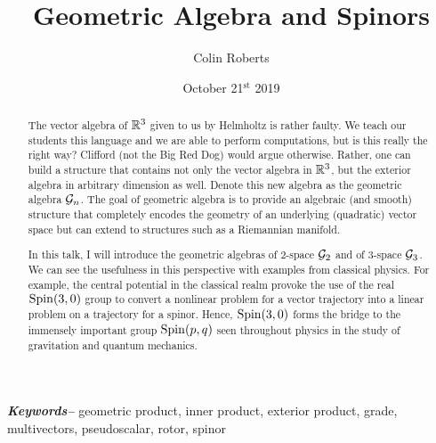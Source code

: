 \documentclass[12pt]{article}
\title{Geometric Algebra and Spinors}
\author{Colin Roberts}
\date{October 21$^\textrm{st}$ 2019}
\providecommand{\keywords}[1]
{
    \hspace*{0pt}\small	
  \textbf{\textit{Keywords--}} #1
}
\begin{document}
\begin{titlingpage}
    \maketitle
    \vfill
    \begin{abstract}
        The vector algebra of $\mathbb{R}^3$ given to us by Helmholtz is rather faulty.  We teach our students this language and we are able to perform computations, but is this really the right way? Clifford (not the Big Red Dog) would argue otherwise.  Rather, one can build a structure that contains not only the vector algebra in $\mathbb{R}^3$, but the exterior algebra in arbitrary dimension as well. Denote this new algebra as the geometric algebra $\mathcal{G}_n$. The goal of geometric algebra is to provide an algebraic (and smooth) structure that completely encodes the geometry of an underlying (quadratic) vector space but can extend to structures such as a Riemannian manifold. 
        
        In this talk, I will introduce the geometric algebras of 2-space $\mathcal{G}_2$ and of 3-space $\mathcal{G}_3$.  We can see the usefulness in this perspective with examples from classical physics. For example, the central potential in the classical realm provoke the use of the real $\mathrm{Spin}(3,0)$ group to convert a nonlinear problem for a vector trajectory into a linear problem on a trajectory for a spinor. Hence, $\mathrm{Spin}(3,0)$ forms the bridge to the immensely important group $\mathrm{Spin}(p,q)$ seen throughout physics in the study of gravitation and quantum mechanics. 
    \end{abstract}
    \keywords{geometric product, inner product, exterior product, grade, multivectors, pseudoscalar, rotor, spinor}
\end{titlingpage}


\end{document}

